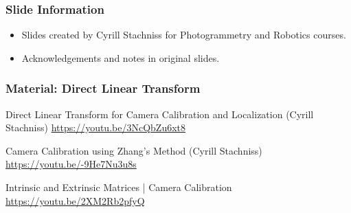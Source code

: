 \begin{frame}
  \frametitle{Slide Information}
  \begin{itemize}
    \item Slides created by Cyrill Stachniss for Photogrammetry and Robotics courses.
    \item Acknowledgements and notes in original slides.
  \end{itemize}
\end{frame}





\begin{frame}
  \frametitle{Material: Direct Linear Transform}

  Direct Linear Transform for Camera Calibration and Localization (Cyrill Stachniss)
  \url{https://youtu.be/3NcQbZu6xt8}

  Camera Calibration using Zhang's Method (Cyrill Stachniss)
  \url{https://youtu.be/-9He7Nu3u8s}

  Intrinsic and Extrinsic Matrices | Camera Calibration
  \url{https://youtu.be/2XM2Rb2pfyQ}

\end{frame}
